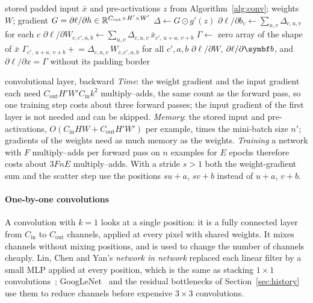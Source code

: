 \documentclass[11pt]{article}
\newcommand{\Cin}{C_{\mathrm{in}}}
\newcommand{\Cout}{C_{\mathrm{out}}}
\newcommand{\Hout}{H'}
\newcommand{\Wout}{W'}
\begin{document}
\begin{algorithm}[htbp]
\caption{Convolutional layer, backward pass (stride 1, one example)}\label{alg:convback}
\begin{algorithmic}[1]
\Require stored padded input $\bar x$ and pre-activations $z$ from Algorithm~\ref{alg:conv}; weights $W$;
  gradient $G = \partial \ell/\partial h \in \R^{\Cout \times \Hout \times \Wout}$
  \State $\Delta \gets G \odot g'(z)$ 
  \State $\partial \ell/\partial b_c \gets \sum_{u,v}\Delta_{c,u,v}$ for each $c$
    \State $\partial \ell/\partial W_{c,c',a,b} \gets \sum_{u,v} \Delta_{c,u,v}\, \bar x_{c',\,u+a,\,v+b}$ 
  \EndFor
  \State $\Gamma \gets$ zero array of the shape of $\bar x$
    
    \State $\Gamma_{c',\,u+a,\,v+b} \mathrel{+}= \Delta_{c,u,v}\, W_{c,c',a,b}$ for all $c', a, b$
  \EndFor
  \State \Return $\partial \ell/\partial W$, $\partial \ell/\partial \vect{b}$, and $\partial \ell/\partial x = \Gamma$ without its padding border
\EndFunction
\end{algorithmic}
\end{algorithm}

\begin{runtime}{convolutional layer, backward}
\emph{Time}: the weight gradient and the input gradient each need $\Cout\Hout\Wout\Cin k^2$ multiply--adds, the same count as
the forward pass, so one training step costs about three forward passes; the input gradient of the first layer is not
needed and can be skipped. \emph{Memory}: the stored input and pre-activations, $O(\Cin HW + \Cout\Hout\Wout)$ per
example, times the mini-batch size $n'$; gradients of the weights need as much memory as the weights. \emph{Training} a
network with $F$ multiply--adds per forward pass on $n$ examples for $E$ epochs therefore costs about $3FnE$
multiply--adds. With a stride $s > 1$ both the weight-gradient sum and the scatter step use the positions $su + a$,
$sv + b$ instead of $u + a$, $v + b$.
\end{runtime}

\paragraph{One-by-one convolutions} A convolution with $k = 1$ looks at a single position: it is a fully connected layer
from $\Cin$ to $\Cout$ channels, applied at every pixel with shared weights. It mixes channels without mixing positions,
and is used to change the number of channels cheaply. Lin, Chen and Yan's \emph{network in network} replaced each linear
filter by a small MLP applied at every position, which is the same as stacking $1 \times 1$ convolutions~\cite{lin2014};
GoogLeNet~\cite{szegedy2015} and the residual bottlenecks of Section~\ref{sec:history} use them to reduce channels before
expensive $3 \times 3$ convolutions.
\end{document}
